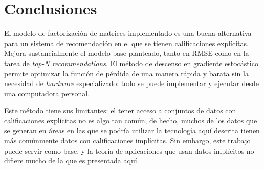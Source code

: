 
\chapter{Conclusiones}

El modelo de factorización de matrices implementado es una buena alternativa para un sistema de recomendación en el que se tienen calificaciones explícitas. Mejora sustancialmente el modelo base planteado, tanto en RMSE como en la tarea de \textit{top-N recommendations}. El método de descenso en gradiente estocástico permite optimizar la función de pérdida de una manera rápida y barata sin la necesidad de \textit{hardware} especializado: todo se puede implementar y ejecutar desde una computadora personal.

Este método tiene sus limitantes: el tener acceso a conjuntos de datos con calificaciones explícitas no es algo tan común, de hecho, muchos de los datos que se generan en áreas en las que se podría utilizar la tecnología aquí descrita tienen más comúnmente datos con calificaciones implícitas. Sin embargo, este trabajo puede servir como base, y la teoría de aplicaciones que usan datos implícitos no difiere mucho de la que es presentada aquí.
